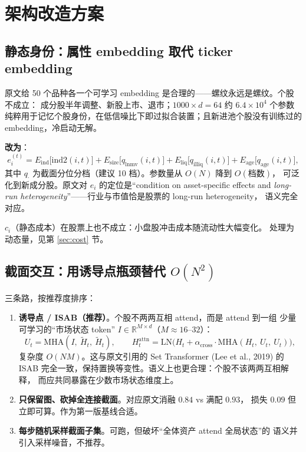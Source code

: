 \documentclass[11pt, a4paper]{ctexart}
\begin{document}
\section{架构改造方案}

\subsection{静态身份：属性 embedding 取代 ticker embedding}

原文给 50 个品种各一个可学习 embedding 是合理的——螺纹永远是螺纹。个股不成立：
成分股半年调整、新股上市、退市；$1000\times d{=}64$ 约 $6.4\times10^4$ 个参数
纯粹用于记忆个股身份，在低信噪比下即过拟合装置；且新进池个股没有训练过的
embedding，冷启动无解。

\textbf{改为}：
\begin{equation}
e_i^{(t)} = E_{\text{ind}}\bigl[\mathrm{ind2}(i,t)\bigr]
          + E_{\text{size}}\bigl[q_{\text{lnmv}}(i,t)\bigr]
          + E_{\text{liq}}\bigl[q_{\text{illiq}}(i,t)\bigr]
          + E_{\text{age}}\bigl[q_{\text{age}}(i,t)\bigr],
\end{equation}
其中 $q_\cdot$ 为截面分位分档（建议 10 档）。参数量从 $O(N)$ 降到 $O(\text{档数})$，
可泛化到新成分股。原文对 $e_i$ 的定位是“condition on asset-specific effects and
\emph{long-run heterogeneity}”——行业与市值恰是股票的 long-run heterogeneity，
语义完全对应。

$c_i$（静态成本）在股票上也不成立：小盘股冲击成本随流动性大幅变化。
处理为动态量，见第 \ref{sec:cost} 节。

\subsection{截面交互：用诱导点瓶颈替代 $O(N^2)$}

三条路，按推荐度排序：

\begin{enumerate}
  \item \textbf{诱导点 / ISAB（推荐）}。个股不两两互相 attend，而是 attend 到一组
        少量可学习的“市场状态 token” $I \in \mathbb{R}^{M\times d}$（$M \approx 16\text{--}32$）：
        \begin{equation}
          U_t = \mathrm{MHA}(I,\ \tilde H_t,\ \tilde H_t), \qquad
          H^{\text{attn}}_t = \mathrm{LN}\bigl(H_t + \alpha_{\text{cross}}\cdot
          \mathrm{MHA}(H_t,\ U_t,\ U_t)\bigr),
        \end{equation}
        复杂度 $O(NM)$。这与原文引用的 Set Transformer (Lee et al., 2019) 的
        ISAB 完全一致，保持置换等变性。语义上也更合理：个股不该两两互相解释，
        而应共同暴露在少数市场状态维度上。
  \item \textbf{只保留图、砍掉全连接截面}。对应原文消融 $0.84$ vs 满配 $0.93$，
        损失 $0.09$ 但立即可算。作为第一版基线合适。
  \item \textbf{每步随机采样截面子集}。可跑，但破坏“全体资产 attend 全局状态”的
        语义并引入采样噪音，不推荐。
\end{enumerate}
\end{document}
